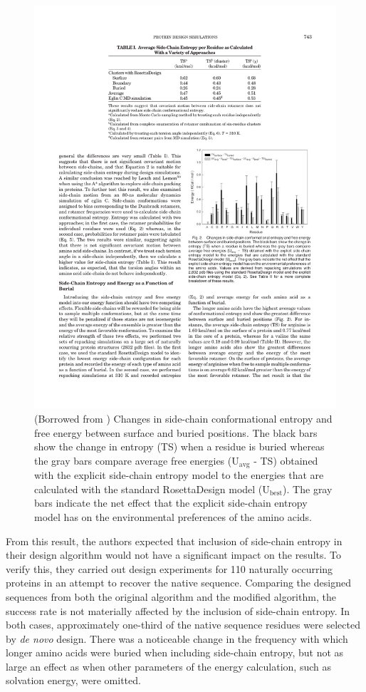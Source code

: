 \begin{figure}[ht]
	\center
	\includegraphics{surface_vs_buried}
	\caption{(Borrowed from \cite{Hu:2006p68}) Changes in side-chain conformational entropy and free energy between surface and buried positions. The black bars show the change in entropy (TS) when a residue is buried whereas the gray bars compare average free energies ($\mathrm{U_{avg}}$ - TS) obtained with the explicit side-chain entropy model to the energies that are calculated with the standard RosettaDesign model ($\mathrm{U_{best}}$). The gray bars indicate the net effect that the explicit side-chain entropy model has on the environmental preferences of the amino acids.}
	\label{fig:surface_vs_buried}
\end{figure}

From this result, the authors expected that inclusion of side-chain entropy in their design algorithm would not have a significant impact on the results. To verify this, they carried out design experiments for 110 naturally occurring proteins in an attempt to recover the native sequence. Comparing the designed sequences from both the original algorithm and the modified algorithm, the success rate is not materially affected by the inclusion of side-chain entropy. In both cases, approximately one-third of the native sequence residues were selected by \emph{de novo} design. There was a noticeable change in the frequency with which longer amino acids were buried when including side-chain entropy, but not as large an effect as when other parameters of the energy calculation, such as solvation energy, were omitted.

